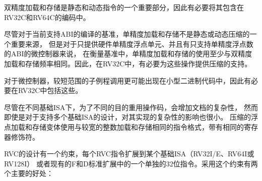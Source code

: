 \begin{commentary}
双精度加载和存储是静态和动态指令的一个重要部分，因此有必要将其包含在RV32C和RV64C的编码中。

尽管对于当前支持ABI的编译的基准，单精度加载和存储不是静态或动态压缩的一个重要来源，
但是对于只提供硬件单精度浮点单元、并且有只支持单精度浮点数的ABI的微控制器来说，
在衡量基准中，单精度加载和存储的使用至少与双精度加载和存储频率相同。因此，在RV32C中，有必要为这些操作提供压缩的支持。

对于微控制器，较短范围的子例程调用更可能出现在小型二进制代码中，因此有必要在RV32C中包括这些。

尽管在不同基础ISA下，为了不同的目的重用操作码，会增加文档的复杂性，
然而即使是对于支持多个基础ISA的设计，对其实现的复杂性的影响也很小。
压缩的浮点加载和存储变体使用与较宽的整数加载和存储相同的指令格式，带有相同的寄存器修饰符。
\end{commentary}

RVC的设计有一个约束，每个RVC指令扩展到某个基础ISA（RV32I/E、RV64I或RV128I）
或者现有的F和D标准扩展中的一个单独的32位指令。采用这个约束有两个主要的好处：

